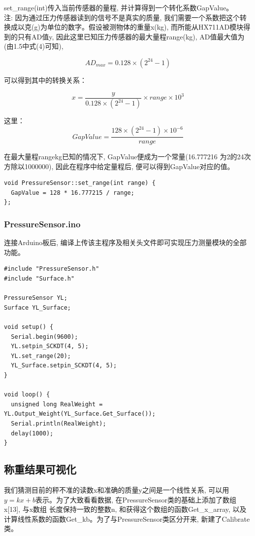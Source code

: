 \documentclass{article}
\begin{document}
set\_range(int)传入当前传感器的量程, 并计算得到一个转化系数GapValue。\\
\noindent 注: 因为通过压力传感器读到的信号不是真实的质量, 
我们需要一个系数把这个转换成以克(g)为单位的数字。假设被测物体的重量x(kg), 而所能从HX711AD模块得到的只有AD值y, 
因此这里已知压力传感器的最大量程range(kg), AD值最大值为(由1.5中式(4)可知),

\begin{equation}
	AD_{max} = 0.128\times(2^{24}-1)
\end{equation}

可以得到其中的转换关系：

\begin{equation}
	x = \frac{y}{0.128\times(2^{24}-1)}\times range\times 10^3
\end{equation}

这里：
\begin{equation}
	GapValue = \frac{128\times(2^{24}-1)\times 10^{-6}}{range}
\end{equation}

在最大量程rangekg已知的情况下, GapValue便成为一个常量(16.777216 为2的24次方除以1000000), 因此在程序中给定量程后, 便可以得到GapValue对应的值。

\begin{lstlisting}
void PressureSensor::set_range(int range) {
  GapValue = 128 * 16.777215 / range;
};
\end{lstlisting}

\subsubsection{PressureSensor.ino}
连接Arduino板后, 编译上传该主程序及相关头文件即可实现压力测量模块的全部功能。

\begin{lstlisting}
#include "PressureSensor.h"
#include "Surface.h"

PressureSensor YL;
Surface YL_Surface;

void setup() {
  Serial.begin(9600);
  YL.setpin_SCKDT(4, 5);
  YL.set_range(20);
  YL_Surface.setpin_SCKDT(4, 5);
}

void loop() {
  unsigned long RealWeight = YL.Output_Weight(YL_Surface.Get_Surface());
  Serial.println(RealWeight);
  delay(1000);
}
\end{lstlisting}

\subsection{称重结果可视化}
我们猜测目前的秤不准的读数x和准确的质量y之间是一个线性关系, 可以用$y=kx+b$表示。为了大致看看数据, 在PressureSensor类的基础上添加了数组x[13], 与x数组
长度保持一致的整数n, 和获得这个数组的函数Get\_x\_array, 以及计算线性系数的函数Get\_kb。为了与PressureSensor类区分开来, 新建了Calibrate类。
\end{document}
